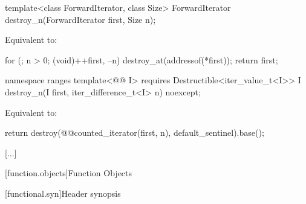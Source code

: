 %
\begin{itemdecl}
template<class ForwardIterator, class Size>
  ForwardIterator destroy_n(ForwardIterator first, Size n);
\end{itemdecl}

\begin{itemdescr}
\pnum
\effects
Equivalent to:
\begin{codeblock}
for (; n > 0; (void)++first, --n)
  destroy_at(addressof(*first));
return first;
\end{codeblock}
\end{itemdescr}

\begin{addedblock}
%
\begin{itemdecl}
namespace ranges {
  template<@@ I>
      requires Destructible<iter_value_t<I>>
    I destroy_n(I first, iter_difference_t<I> n) noexcept;
}
\end{itemdecl}

\begin{itemdescr}
\pnum
\effects Equivalent to:
\begin{codeblock}
return destroy(@@counted_iterator(first, n), default_sentinel{}).base();
\end{codeblock}
\end{itemdescr}
\end{addedblock}

[...]

\setcounter{section}{13}
[function.objects]{Function Objects}

[functional.syn]{Header  synopsis}

